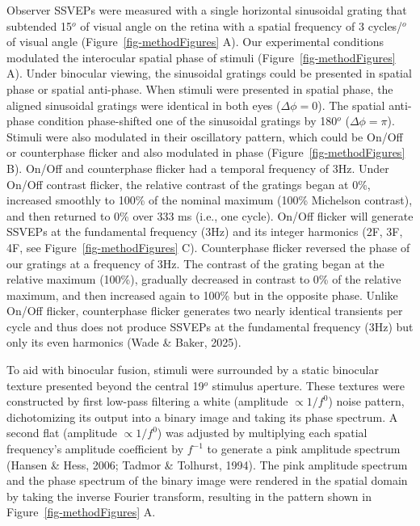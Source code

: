 \documentclass[
  12pt,
]{article}
\begin{document}
Observer SSVEPs were measured with a single horizontal sinusoidal
grating that subtended 15\(^o\) of visual angle on the retina with a
spatial frequency of 3 cycles/\(^o\) of visual angle
(Figure~\ref{fig-methodFigures} A). Our experimental conditions
modulated the interocular spatial phase of stimuli
(Figure~\ref{fig-methodFigures} A). Under binocular viewing, the
sinusoidal gratings could be presented in spatial phase or spatial
anti-phase. When stimuli were presented in spatial phase, the aligned
sinusoidal gratings were identical in both eyes (\(\Delta \phi = 0\)).
The spatial anti-phase condition phase-shifted one of the sinusoidal
gratings by 180\(^o\) (\(\Delta \phi = \pi\)). Stimuli were also
modulated in their oscillatory pattern, which could be On/Off or
counterphase flicker and also modulated in phase
(Figure~\ref{fig-methodFigures} B). On/Off and counterphase flicker had
a temporal frequency of 3Hz. Under On/Off contrast flicker, the relative
contrast of the gratings began at 0\%, increased smoothly to 100\% of
the nominal maximum (100\% Michelson contrast), and then returned to 0\%
over 333 ms (i.e., one cycle). On/Off flicker will generate SSVEPs at
the fundamental frequency (3Hz) and its integer harmonics (2F, 3F, 4F,
see Figure~\ref{fig-methodFigures} C). Counterphase flicker reversed the
phase of our gratings at a frequency of 3Hz. The contrast of the grating
began at the relative maximum (100\%), gradually decreased in contrast
to 0\% of the relative maximum, and then increased again to 100\% but in
the opposite phase. Unlike On/Off flicker, counterphase flicker
generates two nearly identical transients per cycle and thus does not
produce SSVEPs at the fundamental frequency (3Hz) but only its even
harmonics (Wade \& Baker, 2025).

To aid with binocular fusion, stimuli were surrounded by a static
binocular texture presented beyond the central 19\(^o\) stimulus
aperture. These textures were constructed by first low-pass filtering a
white (amplitude \(\propto 1/f^0\)) noise pattern, dichotomizing its
output into a binary image and taking its phase spectrum. A second flat
(amplitude \(\propto 1/f^0\)) was adjusted by multiplying each spatial
frequency's amplitude coefficient by \(f^{-1}\) to generate a pink
amplitude spectrum (Hansen \& Hess, 2006; Tadmor \& Tolhurst, 1994). The
pink amplitude spectrum and the phase spectrum of the binary image were
rendered in the spatial domain by taking the inverse Fourier transform,
resulting in the pattern shown in Figure~\ref{fig-methodFigures} A.
\end{document}
